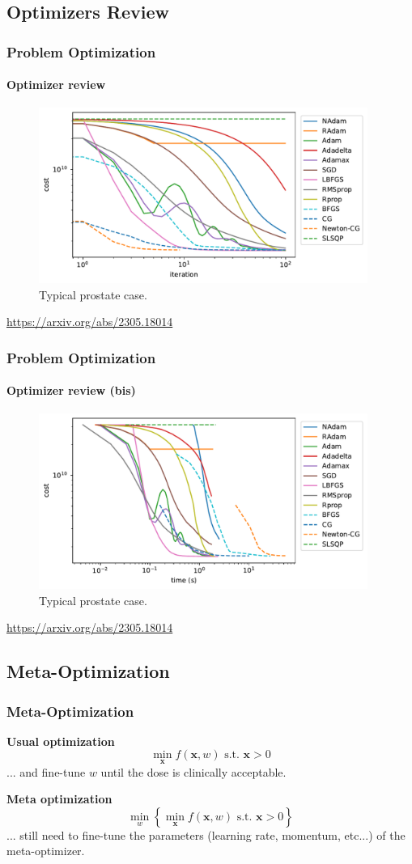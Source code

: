 \documentclass{beamer}
\begin{document}
	\subsection{Optimizers Review}
	\begin{frame}
		\frametitle{Problem Optimization}
		\framesubtitle{Optimizer review}
		\begin{figure}
			\includegraphics[width=10.75cm]{figures/ICMProstate-iter.pdf}
			\caption{Typical prostate case.}
		\end{figure}
		\url{https://arxiv.org/abs/2305.18014}
	\end{frame}
	\begin{frame}
		\frametitle{Problem Optimization}
		\framesubtitle{Optimizer review (bis)}
		\begin{figure}
			\includegraphics[width=10.75cm]{figures/ICMProstate-time.pdf}
			\caption{Typical prostate case.}
		\end{figure}
		\url{https://arxiv.org/abs/2305.18014}
	\end{frame}
	
	\subsection{Meta-Optimization}
	\begin{frame}
		\frametitle{Meta-Optimization}
		\textbf{Usual optimization}
		$$\min_{\textbf{x}} f(\textbf{x}, w) \text{ s.t. } \textbf{x} > 0$$
		... and fine-tune $w$ until the dose is clinically acceptable.
		\vspace{0.5cm}
		
		\textbf{Meta optimization}
		$$\min_w \left\lbrace \min_{\textbf{x}} f(\textbf{x}, w) \text{ s.t. } \textbf{x} > 0 \right\rbrace $$
		... still need to fine-tune the parameters (learning rate, momentum, etc...) of the meta-optimizer.
	\end{frame}
	
\end{document}

